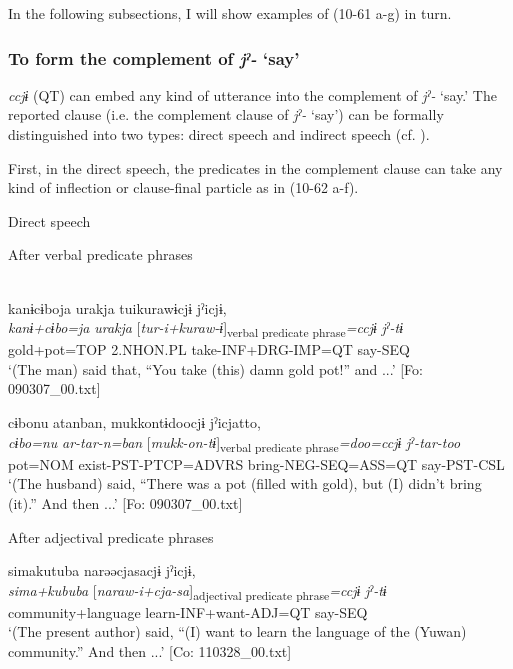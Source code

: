 \begin{xlist}
In the following subsections, I will show examples of (10-61 a-g) in turn.

\subsubsection{To form the complement of \textit{jˀ-} ‘say’}\label{sec:10.4.1.1}

\textit{ccjɨ} (QT) can embed any kind of utterance into the complement of \textit{jˀ-} ‘say.’ The reported clause (i.e. the complement clause of \textit{jˀ-} ‘say’) can be formally distinguished into two types: direct speech and indirect speech (cf. \citealt{Aikhenvald2004}).

First, in the direct speech, the predicates in the complement clause can take any kind of inflection or clause-final particle as in (10-62 a-f).

\ea\label{ex:10.62}   Direct speech\\
  \begin{xlist}
  \exi{} After verbal predicate phrases

  \ex\relax [= (8-148 g)]\\
      \glll    kanɨcɨboja  urakja  tuikurawɨcjɨ  jˀicjɨ,\\
      \textit{kanɨ+cɨbo=ja}  \textit{urakja}  [\textit{tur-i+kuraw-ɨ}]\textsubscript{verbal predicate phrase}\textit{=ccjɨ}  \textit{jˀ{}-tɨ}\\
      gold+pot=TOP  2.NHON.PL  take-INF+DRG-IMP=QT  say-SEQ\\
      \glt       ‘(The man) said that, “You take (this) damn gold pot!” and ...’ [Fo: 090307\_00.txt]

  \ex %
      \glll    cɨbonu  atanban,  mukkontɨdoocjɨ     jˀicjatto,\\
      \textit{cɨbo=nu}  \textit{ar-tar-n=ban}  [\textit{mukk-on-tɨ}]\textsubscript{verbal predicate phrase}\textit{=doo=ccjɨ}   \textit{jˀ{}-tar-too}\\
      pot=NOM  exist-PST-PTCP=ADVRS  bring-NEG-SEQ=ASS=QT   say-PST-CSL\\
      \glt       ‘(The husband) said, “There was a pot (filled with gold), but (I) didn’t bring (it).” And then ...’ [Fo: 090307\_00.txt]

  \exi{} After adjectival predicate phrases

  \ex  %
      \glll    simakutuba  narəəcjasacjɨ  jˀicjɨ,\\
      \textit{sima+kububa}  [\textit{naraw-i+cja-sa}]\textsubscript{adjectival predicate phrase}\textit{=ccjɨ}  \textit{jˀ{}-tɨ}\\
      community+language  learn-INF+want-ADJ=QT  say-SEQ\\
      \glt       ‘(The present author) said, “(I) want to learn the language of the (Yuwan) community.” And then ...’ [Co: 110328\_00.txt]


\end{xlist}
\end{xlist}
